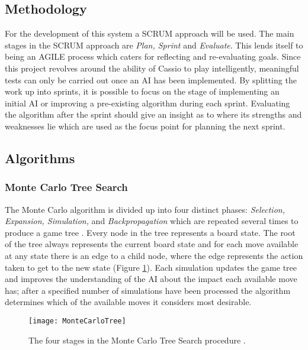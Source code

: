 \documentclass[12pt,a4paper]{article}
\begin{document}
\subsection{Methodology}

For the development of this system a SCRUM approach will be used. The main stages in the SCRUM approach are \textit{Plan, Sprint} and \textit{Evaluate}. This lends itself to being an AGILE process which caters for reflecting and re-evaluating goals. Since this project revolves around the ability of Cassio to play intelligently, meaningful tests can only be carried out once an AI has been implemented. By splitting the work up into sprints, it is possible to focus on the stage of implementing an initial AI or improving a pre-existing algorithm during each sprint. Evaluating the algorithm after the sprint should give an insight as to where its strengths and weaknesses lie which are used as the focus point for planning the next sprint.

\subsection{Algorithms}

\subsubsection{Monte Carlo Tree Search}



The Monte Carlo algorithm is divided up into four distinct phases: \textit{Selection, Expansion, Simulation,} and \textit{Backpropagation} which are repeated several times to produce a game tree \cite{archer2007analysis}. Every node in the tree represents a board state. The root of the tree always represents the current board state and  for each move available at any state there is an edge to a child node, where the edge represents the action taken to get to the new state (Figure \ref{fig:monte_carlo_tree_diagram}). Each simulation updates the game tree and improves the understanding of the AI about the impact each available move has; after a specified number of simulations have been processed the algorithm determines which of the available moves it considers most desirable.



\begin{figure}[H]
\centering
\texttt{[image: MonteCarloTree]}
\caption{The four stages in the Monte Carlo Tree Search procedure \protect\cite{browne2012survey}.}
\label{fig:monte_carlo_tree_diagram}
\end{figure}
\end{document}
